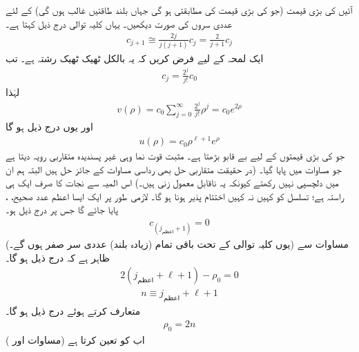  آئیں  کی بڑی قیمت (جو  کی بڑی قیمت کی مطابقتی ہو گی جہاں بلند طاقتیں غالب ہوں گی) کے لئے عددی سروں کی صورت دیکھیں۔ یہاں کلیہ توالی درج ذیل کہتا ہے۔
\begin{align*}
c_{j+1}\cong\frac{2j}{j(j+1)}c_{j}=\frac{2}{j+1}c_{j} 
\end{align*}
ایک لمحہ کے لیے فرض کریں کہ یہ بالکل ٹھیک ٹھیک رشتہ ہے۔ تب 
\begin{align}
c_{j}=\frac{2^{j}}{j!}c_{0} 
\end{align}
لہٰذا
\begin{align*}
v(\rho)=c_{0}\sum_{j=0}^{\infty}\frac{2^{j}}{j!}\rho^{j}=c_{0}e^{2\rho} 
\end{align*}
 اور یوں درج ذیل ہو گا
\begin{align}
u(\rho)=c_{0}\rho^{\ell+1}e^{\rho} 
\end{align}
 جو  کی بڑی قیمتوں کے لیے بے قابو بڑھتا ہے۔ مثبت قوت نما وہی غیر پسندیدہ متقاربی رویہ دیتا ہے جو مساوات  میں پایا گیا۔ (در حقیقت متقاربی حل بھی رداسی مساوات کے جائز حل ہیں البتہ ہم ان میں دلچسپی نہیں رکھتے کیونکہ یہ ناقابل معمول زنی ہیں۔) اس المیہ سے نجات کا صرف ایک ہی راستہ ہے؛ تسلسل کو کہیں نہ کہیں اختتام پذیر ہونا ہو گا۔ لازمی طور پر ایک ایسا اعظم عدد صحیح، ، پایا جائے گا جس پر درج ذیل ہو۔
 \begin{align}
c_{(j_{\text{اعظم}}+1)}=0
\end{align}
 (یوں کلیہ توالی کے تحت باقی تمام (زیادہ بلند) عددی سر صفر ہوں گے۔) مساوات  سے ظاہر ہے کہ درج ذیل ہو گا۔
 \begin{align*}
2(j_{\text{اعظم}}+\ell+1)-\rho_{0}=0 
\end{align*}
 \begin{align}\label{مساوات_ابعادی_صدر_کوانٹائی_عدد}
n\equiv j_{\text{اعظم}}+\ell+1 
\end{align}
 متعارف کرتے ہوئے درج ذیل ہو گا۔
 \begin{align}\label{مساوات_ابعادی_رو_این}
\rho_{0}=2n 
\end{align}
 اب  کو  تعین کرتا ہے (مساوات  اور )
